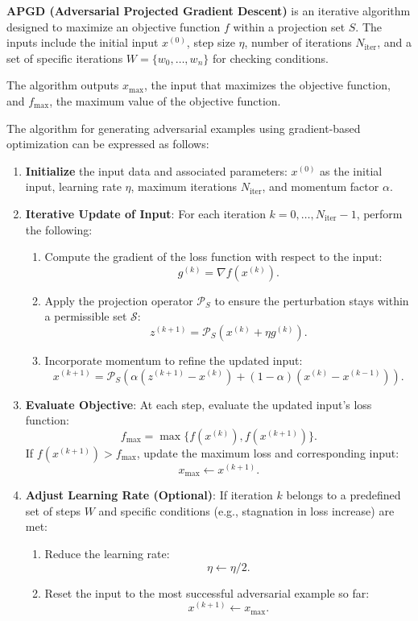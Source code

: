 \textbf{APGD (Adversarial Projected Gradient Descent)} is an iterative algorithm designed to maximize an objective function $f$ within a projection set $S$. The inputs include the initial input $x^{(0)}$, step size $\eta$, number of iterations $N_{\text{iter}}$, and a set of specific iterations $W = \{w_0, \ldots, w_n\}$ for checking conditions. 

The algorithm outputs $x_{\text{max}}$, the input that maximizes the objective function, and $f_{\text{max}}$, the maximum value of the objective function.

The algorithm for generating adversarial examples using gradient-based optimization can be expressed as follows:

\begin{enumerate}
    \item \textbf{Initialize} the input data and associated parameters:  
    $x^{(0)}$ as the initial input, learning rate $\eta$, maximum iterations $N_{\text{iter}}$, and momentum factor $\alpha$.

    \item \textbf{Iterative Update of Input}:  
    For each iteration $k = 0, \dots, N_{\text{iter}} - 1$, perform the following:  
    \begin{enumerate}
        \item Compute the gradient of the loss function with respect to the input:  
        \[
        g^{(k)} = \nabla f(x^{(k)}).
        \]
        \item Apply the projection operator $\mathcal{P}_S$ to ensure the perturbation stays within a permissible set $\mathcal{S}$:  
        \[
        z^{(k+1)} = \mathcal{P}_S \left( x^{(k)} + \eta g^{(k)} \right).
        \]
        \item Incorporate momentum to refine the updated input:  
        \[
        x^{(k+1)} = \mathcal{P}_S \left( \alpha (z^{(k+1)} - x^{(k)}) + (1 - \alpha)(x^{(k)} - x^{(k-1)}) \right).
        \]
    \end{enumerate}

    \item \textbf{Evaluate Objective}:  
    At each step, evaluate the updated input's loss function:  
    \[
    f_{\text{max}} = \max \{ f(x^{(k)}), f(x^{(k+1)}) \}.
    \]
    If $f(x^{(k+1)}) > f_{\text{max}}$, update the maximum loss and corresponding input:  
    \[
    x_{\text{max}} \gets x^{(k+1)}.
    \]

    \item \textbf{Adjust Learning Rate (Optional)}:  
    If iteration $k$ belongs to a predefined set of steps $W$ and specific conditions (e.g., stagnation in loss increase) are met:  
    \begin{enumerate}
        \item Reduce the learning rate:  
        \[
        \eta \gets \eta / 2.
        \]
        \item Reset the input to the most successful adversarial example so far:  
        \[
        x^{(k+1)} \gets x_{\text{max}}.
        \]
    \end{enumerate}


\end{enumerate}
